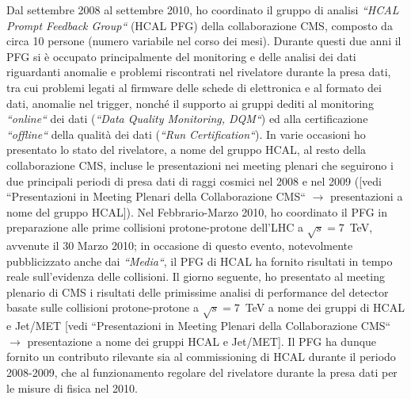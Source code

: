 \documentclass[10pt, a4paper]{article}
\begin{document}
Dal settembre 2008 al settembre 2010, ho coordinato il gruppo di analisi 
{\it ``HCAL Prompt Feedback Group``} (HCAL PFG) della collaborazione CMS, composto da circa 10 persone
(numero variabile nel corso dei mesi). Durante questi due anni 
il PFG si \`e occupato principalmente del monitoring e delle analisi dei dati riguardanti anomalie 
e problemi riscontrati nel rivelatore durante la presa dati, tra cui problemi legati al firmware 
delle schede di elettronica e al formato dei dati, anomalie nel trigger, nonch\'e il supporto ai gruppi dediti al 
monitoring {\it ``online``} dei dati ({\it ``Data Quality Monitoring, DQM``}) ed alla certificazione {\it ``offline``} 
della qualit\`a dei dati ({\it ``Run Certification``}). 
In varie occasioni ho presentato lo stato del rivelatore, a nome del gruppo HCAL, al resto della collaborazione CMS, 
incluse le presentazioni nei meeting plenari che seguirono i due principali periodi di presa dati di raggi cosmici 
nel 2008 e nel 2009 ([vedi ``Presentazioni in Meeting Plenari della Collaborazione CMS`` $\rightarrow$  
presentazioni a nome del gruppo HCAL]). Nel Febbrario-Marzo 2010, ho coordinato il PFG in preparazione alle 
prime collisioni protone-protone dell'LHC a $\sqrt{s}=7$~TeV, avvenute il 30 Marzo 2010; in occasione di questo evento, 
notevolmente pubblicizzato anche dai {\it ``Media``}, il PFG di HCAL ha fornito risultati in tempo reale 
sull'evidenza delle collisioni. Il giorno seguente, ho presentato al meeting plenario di CMS i risultati delle 
primissime analisi di performance del detector basate sulle collisioni protone-protone a $\sqrt{s}=7$~TeV a nome dei gruppi di HCAL e Jet/MET 
[vedi ``Presentazioni in Meeting Plenari della Collaborazione CMS`` $\rightarrow$ presentazione 
a nome dei gruppi HCAL e Jet/MET]. Il PFG ha dunque fornito un contributo rilevante sia al commissioning 
di HCAL durante il periodo 2008-2009, che al funzionamento regolare del rivelatore durante la presa dati 
per le misure di fisica nel 2010. \\
\end{document}
